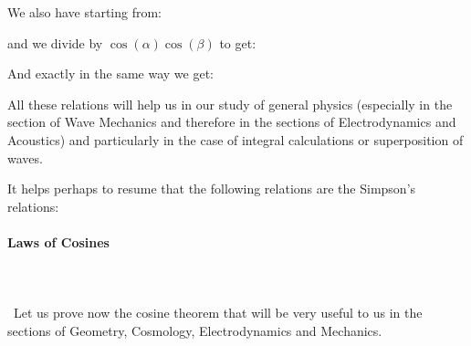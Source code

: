 	
	We also have starting from:	
	
	and we divide by $\cos(\alpha)\cos(\beta)$ to get:
	
	And exactly in the same way we get:
	
	
	All these relations will help us in our study of general physics (especially in the section of Wave Mechanics and therefore in the sections of Electrodynamics and Acoustics) and particularly in the case of integral calculations or superposition of waves.
	
	\begin{tcolorbox}[title=Remark,colframe=black,arc=10pt]
It helps perhaps to resume that the following relations are the Simpson's relations:
	
	\end{tcolorbox}
	
	\paragraph{Laws of Cosines}\mbox{}\\\\\
	Let us prove now the cosine theorem that will be very useful to us in the sections of Geometry, Cosmology, Electrodynamics and Mechanics.
	

